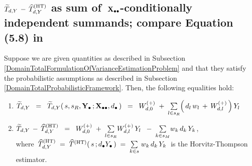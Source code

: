 
\vskip 0.8cm
\subsection{$\widetilde{T}_{d,Y} \,-\, \widehat{T}^{\textnormal{(HT)}}_{d,Y}$
as sum of \,$\mathbf{X}_{\bullet\bullet}$-conditionally independent summands; compare Equation (5.8) in \cite{Beaumont2011}}
\setcounter{theorem}{0}


\begin{lemma}
\label{DomainTotalImputationError}
\mbox{}
\vskip 0.1cm
\noindent
Suppose we are given quantities as described in Subsection
\ref{DomainTotalFormulationOfVarianceEstimationProblem}
and
that they satisfy the probabilistic assumptions as described in Subsection
\ref{DomainTotalProbabilisticFramework}.
\vskip 0.1cm
\noindent
Then, the following equalities hold:
\renewcommand{\theenumi}{\roman{enumi}}
\renewcommand{\labelenumi}{\mbox{}\;\;\,(\theenumi)$\quad$}
\begin{enumerate}
\item
    $
    \widetilde{T}_{d,Y}
    \;\; = \;\;
        \widetilde{T}_{d,Y}(\,s,s_{R},\mathbf{Y}_{\bullet}\,;\mathbf{X}_{\bullet\bullet},d_{\bullet}\,)
    \;\; = \;\;
        W^{(+)}_{d,0}
        \;+\;
        \underset{l \in s_{R}}{\sum}\!\left(\,d_{l}\,w_{l} \,+\, W^{(+)}_{d,l}\,\right)Y_{l}
    $
\item
    $
    \widetilde{T}_{d,Y}
    \, - \,
    \widehat{T}^{\textnormal{(HT)}}_{d,Y}
    \;\; = \;\;
        W^{(+)}_{d,0}
        \;+\;
        \underset{l \in s_{R}}{\sum}W^{(+)}_{d,l}\,Y_{l}
        \;\;-\;
        \underset{k \in s_{M}}{\sum}w_{k}\,d_{k}\,Y_{k}
    $,\\
    where
    \,$
    \widehat{T}^{\textnormal{(HT)}}_{d,Y}
    \; = \;
    \widehat{T}^{\textnormal{(HT)}}(\,s\,;d_{\bullet}Y_{\bullet}\,)
    \; = \;
        \underset{k \in s}{\sum}\;w_{k}\,d_{k}\,Y_{k}
    $\,
    is the Horvitz-Thompson estimator.
\end{enumerate}
\end{lemma}
\proof
